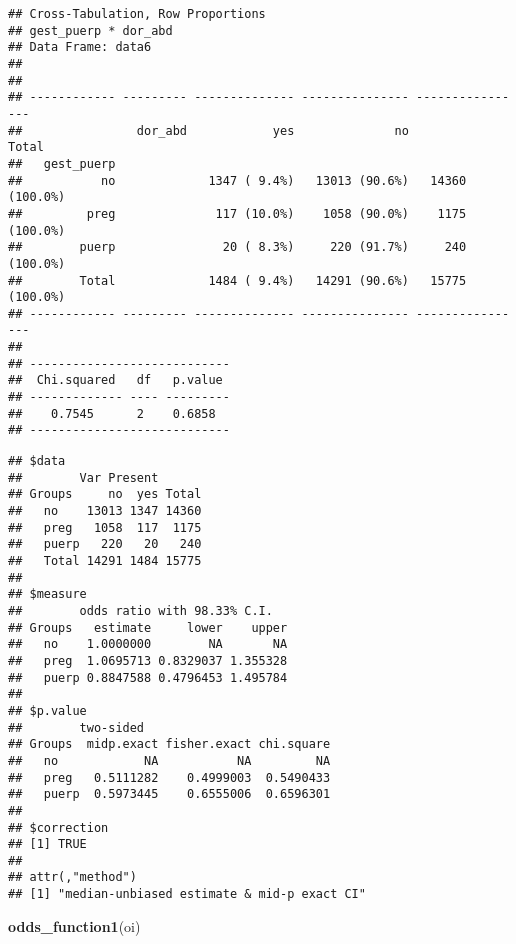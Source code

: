 \documentclass[
]{article}
\newenvironment{Shaded}{\begin{snugshade}}{\end{snugshade}}
\newcommand{\KeywordTok}[1]{\textcolor[rgb]{0.13,0.29,0.53}{\textbf{#1}}}
\newcommand{\NormalTok}[1]{#1}
\newcommand{\OperatorTok}[1]{\textcolor[rgb]{0.81,0.36,0.00}{\textbf{#1}}}
\newcommand{\StringTok}[1]{\textcolor[rgb]{0.31,0.60,0.02}{#1}}
\begin{document}
\begin{verbatim}
## Cross-Tabulation, Row Proportions  
## gest_puerp * dor_abd  
## Data Frame: data6  
## 
## 
## ------------ --------- -------------- --------------- ----------------
##                dor_abd            yes              no            Total
##   gest_puerp                                                          
##           no             1347 ( 9.4%)   13013 (90.6%)   14360 (100.0%)
##         preg              117 (10.0%)    1058 (90.0%)    1175 (100.0%)
##        puerp               20 ( 8.3%)     220 (91.7%)     240 (100.0%)
##        Total             1484 ( 9.4%)   14291 (90.6%)   15775 (100.0%)
## ------------ --------- -------------- --------------- ----------------
## 
## ----------------------------
##  Chi.squared   df   p.value 
## ------------- ---- ---------
##    0.7545      2    0.6858  
## ----------------------------
\end{verbatim}

\begin{Shaded}
\end{Shaded}

\begin{verbatim}
## $data
##        Var Present
## Groups     no  yes Total
##   no    13013 1347 14360
##   preg   1058  117  1175
##   puerp   220   20   240
##   Total 14291 1484 15775
## 
## $measure
##        odds ratio with 98.33% C.I.
## Groups   estimate     lower    upper
##   no    1.0000000        NA       NA
##   preg  1.0695713 0.8329037 1.355328
##   puerp 0.8847588 0.4796453 1.495784
## 
## $p.value
##        two-sided
## Groups  midp.exact fisher.exact chi.square
##   no            NA           NA         NA
##   preg   0.5111282    0.4999003  0.5490433
##   puerp  0.5973445    0.6555006  0.6596301
## 
## $correction
## [1] TRUE
## 
## attr(,"method")
## [1] "median-unbiased estimate & mid-p exact CI"
\end{verbatim}

\begin{Shaded}
\begin{Highlighting}[]
\KeywordTok{odds_function1}\NormalTok{(oi)}
\end{Highlighting}
\end{Shaded}
\end{document}
